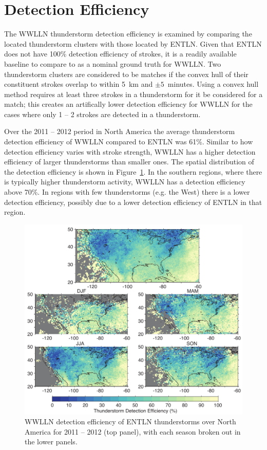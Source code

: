 \section{Detection Efficiency}

The WWLLN thunderstorm detection efficiency is examined by comparing the located thunderstorm clusters with those located by ENTLN.
Given that ENTLN does not have 100\% detection efficiency of strokes, it is a readily available baseline to compare to as a nominal ground truth for WWLLN.
Two thunderstorm clusters are considered to be matches if the convex hull of their constituent strokes overlap to within 5~km and $\pm5$~minutes.
Using a convex hull method requires at least three strokes in a thunderstorm for it be considered for a match; this creates an artifically lower detection efficiency for WWLLN for the cases where only 1 -- 2 strokes are detected in a thunderstorm.

Over the 2011 -- 2012 period in North America the average thunderstorm detection efficiency of WWLLN compared to ENTLN was 61\%.
Similar to how detection efficiency varies with stroke strength, WWLLN has a higher detection efficiency of larger thunderstorms than smaller ones.
The spatial distribution of the detection efficiency is shown in Figure~\ref{thunderstorm:fig:deMap}.
In the southern regions, where there is typically higher thunderstorm activity, WWLLN has a detection efficiency above 70\%.
In regions with few thunderstorms (e.g. the West) there is a lower detection efficiency, possibly due to a lower detection efficiency of ENTLN in that region.

\begin{figure}[ht!]
   \centering
   \includegraphics[scale=1]{thunderstorm/Figures/deMap.pdf}
   \caption{WWLLN detection efficiency of ENTLN thunderstorms over North America for 2011 -- 2012 (top panel), with each season broken out in the lower panels.}
   \label{thunderstorm:fig:deMap}
\end{figure}

